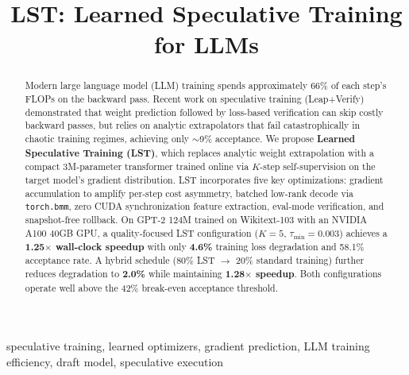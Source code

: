 \documentclass[conference]{IEEEtran}
\begin{document}
\title{LST: Learned Speculative Training for LLMs}

\author{
}

\maketitle

\begin{abstract}
Modern large language model (LLM) training spends approximately 66\% of each step's FLOPs on the backward pass. Recent work on speculative training (Leap+Verify) demonstrated that weight prediction followed by loss-based verification can skip costly backward passes, but relies on analytic extrapolators that fail catastrophically in chaotic training regimes, achieving only $\sim$9\% acceptance. We propose \textbf{Learned Speculative Training (LST)}, which replaces analytic weight extrapolation with a compact 3M-parameter transformer trained online via $K$-step self-supervision on the target model's gradient distribution. LST incorporates five key optimizations: gradient accumulation to amplify per-step cost asymmetry, batched low-rank decode via \texttt{torch.bmm}, zero CUDA synchronization feature extraction, eval-mode verification, and snapshot-free rollback. On GPT-2 124M trained on Wikitext-103 with an NVIDIA A100 40GB GPU, a quality-focused LST configuration ($K{=}5$, $\tau_{\min}{=}0.003$) achieves a \textbf{1.25$\times$ wall-clock speedup} with only \textbf{4.6\%} training loss degradation and 58.1\% acceptance rate. A hybrid schedule (80\% LST $\rightarrow$ 20\% standard training) further reduces degradation to \textbf{2.0\%} while maintaining \textbf{1.28$\times$ speedup}. Both configurations operate well above the 42\% break-even acceptance threshold.
\end{abstract}

\begin{IEEEkeywords}
speculative training, learned optimizers, gradient prediction, LLM training efficiency, draft model, speculative execution
\end{IEEEkeywords}

\end{document}
